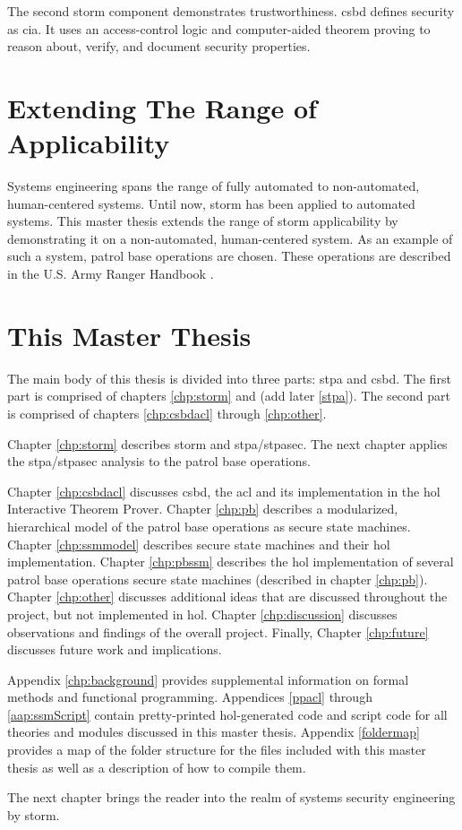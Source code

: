 \documentclass[../../main/main.tex]{subfiles}
\begin{document}
The second \gls{storm} component demonstrates trustworthiness.  \Gls{csbd} defines security as \gls{cia}.  It uses an access-control logic and computer-aided theorem proving to reason about, verify, and document security properties.

\section{Extending The Range of Applicability}\label{sec:intro:motivation}

Systems engineering spans the range of fully automated to non-automated, human-centered systems.  Until now, \gls{storm} has been applied to automated systems.  This master thesis extends the range of \gls{storm} applicability by demonstrating it on a non-automated, human-centered system.  As an example of such a system, patrol base operations are chosen.  These operations are described in the U.S. Army Ranger Handbook \cite{rangermanual}.   

\section{This Master Thesis}\label{sec:thismasterthesis}
The main body of this thesis is divided into three parts: \gls{stpa} and \gls{csbd}. The first part is comprised of chapters \ref{chp:storm} and (add later \ref{stpa}).  The second part is comprised of chapters \ref{chp:csbdacl} through \ref{chp:other}.


Chapter \ref{chp:storm} describes \gls{storm} and \gls{stpa}/\gls{stpasec}.  The next chapter applies the \gls{stpa}/\gls{stpasec} analysis to the patrol base operations.  

Chapter \ref{chp:csbdacl} discusses \gls{csbd}, the \gls{acl} and its implementation in the \Gls{hol} Interactive Theorem Prover.  Chapter \ref{chp:pb} describes a modularized, hierarchical model of the patrol base operations as secure state machines. Chapter \ref{chp:ssmmodel} describes secure state machines and their \gls{hol} implementation.  Chapter \ref{chp:pbssm} describes the \gls{hol} implementation of several patrol base operations secure state machines (described in chapter \ref{chp:pb}).  Chapter \ref{chp:other} discusses additional ideas that are discussed throughout the project, but not implemented in  \gls{hol}.  Chapter \ref{chp:discussion} discusses observations and findings of the overall project.  Finally, Chapter \ref{chp:future} discusses future work and implications. 

Appendix \ref{chp:background} provides supplemental information on formal methods and functional programming.  Appendices \ref{ppacl} through \ref{aap:ssmScript} contain pretty-printed \gls{hol}-generated code and script code for all theories and modules discussed in this master thesis.  Appendix \ref{foldermap} provides a map of the folder structure for the files included with this master thesis as well as a description of how to compile them.

The next chapter brings the reader into the realm of systems security engineering by \gls{storm}.
\end{document}
